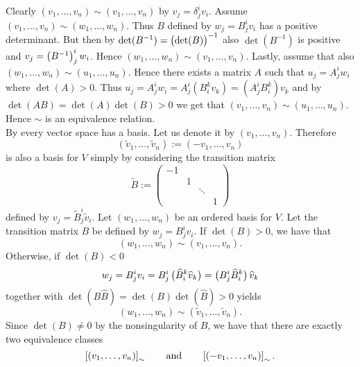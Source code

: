 \begin{solution}
	Clearly $(v_1,\dots,v_n) \sim (v_1,\dots,v_n)$ by $v_j = \delta^i_j v_i$. Assume $(v_1,\dots,v_n) \sim (w_1,\dots,w_n)$. Thus $B$ defined by $w_j = B^i_j v_i$ has a positive  determinant. But then by $\det(B^{-1}) = \del[1]{\det(B)}^{-1}$ also $\det(B^{-1})$ is positive and $v_j = \del[1]{B^{-1}}^i_j w_i$. Hence $(w_1,\dots,w_n) \sim (v_1,\dots,v_n)$. Lastly, assume that also $(w_1,\dots,w_n) \sim (u_1,\dots,u_n)$. Hence there exists a matrix $A$ such that $u_j = A^i_j w_i$ where $\det(A) > 0$. Thus $u_j = A^i_jw_i = A^i_j(B^k_i v_k)=(A^i_jB^k_i)v_k$ and by $\det(AB) = \det(A)\det(B)>0$ we get that $(v_1,\dots,v_n) \sim (u_1,\dots,u_n)$. Hence $\sim$ is an equivalence relation.\\ 
	By \cite[335]{grillet:abstract_algebra:2007} every vector space has a basis. Let us denote it by $(v_1,\dots,v_n)$. Therefore
	\begin{equation*}
		(\widetilde{v}_1,\dots,\widetilde{v}_n) := (-v_1,\dots,v_n)
	\end{equation*}
	\noindent is also a basis for $V$ simply by considering the transition matrix
	\begin{equation*}
		\widetilde{B} := \begin{pmatrix}
		-1\\
		&1\\
		&&\ddots\\
		&&&1
		\end{pmatrix}
	\end{equation*}
	\noindent defined by $v_j = \widetilde{B}^i_j \widetilde{v}_i$. Let $(w_1,\dots,w_n)$ be an ordered basis for $V$. Let the transition matrix $B$ be defined by $w_j = B^ i_j v_i$. If $\det(B) > 0$, we have that 
	\begin{equation*}
		(w_1,\dots,w_n) \sim (v_1,\dots,v_n).
	\end{equation*}
	Otherwise, if $\det(B) < 0$
	\begin{equation*}
		w_j = B^i_j v_i = B^i_j\del[1]{\widehat{B}_i^ k \widehat{v}_k} = \del[1]{B^i_j\widehat{B}_i^ k}\widehat{v}_k
	\end{equation*}
	\noindent together with $\det(B\widehat{B}) = \det(B)\det(\widehat{B}) > 0$ yields
	\begin{equation*}
		(w_1,\dots,w_n) \sim (\widetilde{v}_1,\dots,\widetilde{v}_n).
	\end{equation*}
	\noindent Since $\det(B) \neq 0$ by the nonsingularity of $B$, we have that there are exactly two equivalence classes
	\begin{equation*}
		\sbr[0]{(v_1,\dots,v_n)}_{\sim} \qquad \text{and} \qquad \sbr[0]{(-v_1,\dots,v_n)}_{\sim}.
	\end{equation*}
\end{solution}